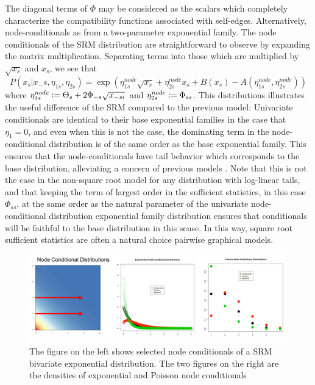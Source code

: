 \documentclass{samkoelleprelimworking}
\begin{document}
The diagonal terms of $\Phi$ may be considered as the scalars which completely characterize the compatibility functions associated with self-edges. Alternatively, node-conditionals as from a two-parameter exponential family.    The node conditionals of the SRM distribution are straightforward to observe by expanding the matrix multiplication. Separating terms into those which are multiplied by $\sqrt{x_s}$ and $x_s$, we see that
\[P(x_s \vert x_-s, \eta_{1s}, \eta_{2s}) = \exp{(\eta_{1s}^{node} \sqrt{x_s} + \eta_{2s}^{node} x_s + B(x_s) - A(\eta_{1s}^{node} , \eta_{2s}^{node} ))} \]
where $\eta_{1s}^{node} \vcentcolon = \Theta_s + 2 \Phi_{-s}\sqrt{x_{-si}}$ and $\eta_{2s}^{node} \vcentcolon = \Phi_{ss}$.  This distributions illustrates the useful difference of the SRM compared to the previous model:   Univariate conditionals are identical to their base exponential families in the case that $\eta_1 = 0$, and even when this is not the case, the dominating term in the node-conditional distribution is of the same order as the base exponential family.  This ensures that the node-conditionals have tail behavior which corresponds to the base distribution, alleviating a concern of previous models \citep{Yang2013-is}. Note that this is not the case in the non-square root model for any distribution with log-linear tails, and that keeping the term of largest order in the sufficient statistics, in this case $\Phi_{ss}$, at the same order as the natural parameter of the univariate node-conditional distribution exponential family distribution ensures that conditionals will be faithful to the base distribution in this sense.  In this way, square root sufficient statistics are often a natural choice pairwise graphical models.

\begin{figure}\label{fig:conditionals}
\includegraphics[width=\textwidth]{fig2condish}
\caption{The figure on the left shows selected node conditionals of a SRM bivariate exponential distribution.  The two figures on the right are the densities of exponential and Poisson node conditionals}
\end{figure}
\end{document}
